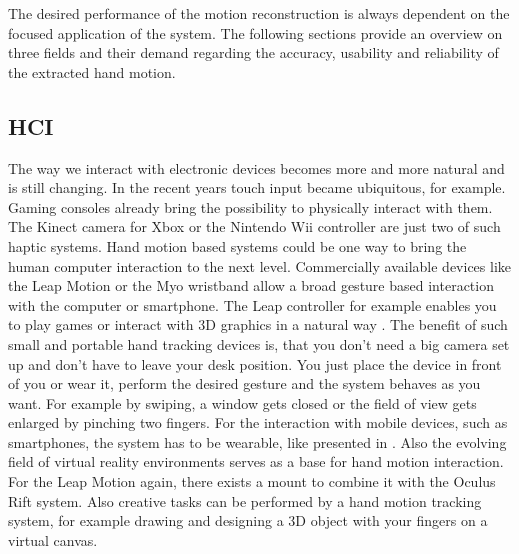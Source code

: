 The desired performance of the motion reconstruction is always dependent on the focused application of the system. The following sections provide an overview on three fields and their demand regarding the accuracy, usability and reliability of the extracted hand motion.


\subsection{\ac{HCI}} \label{subsec:applications:HCI}
The way we interact with electronic devices becomes more and more natural and is still changing. In the recent years touch input became ubiquitous, for example. Gaming consoles already bring the possibility to physically interact with them. The Kinect camera for Xbox or the Nintendo Wii controller are just two of such haptic systems. Hand motion based systems could be one way to bring the human computer interaction to the next level. Commercially available devices like the Leap Motion or the Myo wristband allow a broad gesture based interaction with the computer or smartphone. The Leap controller for example enables you to play games or interact with 3D graphics in a natural way \cite{leap}. The benefit of such small and portable hand tracking devices is, that you don't need a big camera set up and don't have to leave your desk position. You just place the device in front of you or wear it, perform the desired gesture and the system behaves as you want. For example by swiping, a window gets closed or the field of view gets enlarged by pinching two fingers. For the interaction with mobile devices, such as smartphones, the system has to be wearable, like presented in \cite{Digits}. Also the evolving field of virtual reality environments serves as a base for hand motion interaction. For the Leap Motion again, there exists a mount to combine it with the Oculus Rift system. Also creative tasks can be performed by a hand motion tracking system, for example drawing and designing a 3D object with your fingers on a virtual canvas.\\
